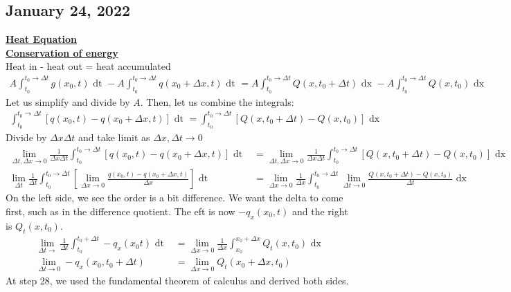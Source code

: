 \documentclass{article}
\newcommand{\topic}[1]{\textbf{\underline{#1}}}
\newcommand{\dx}{\text{ dx }}
\newcommand{\dt}{\text{ dt }}
\begin{document}
\subsection*{January 24, 2022}
\topic{Heat Equation}\\
\topic{Conservation of energy}\\
Heat in - heat out = heat accumulated
\begin{align}
  A \int^{t_0 \rightarrow \Delta t}_{t_0} g(x_0, t) \dt -
  A \int^{t_0 \rightarrow \Delta t}_{t_0} q(x_0 + \Delta x, t) \dt =
  A \int^{t_0 \rightarrow \Delta t}_{t_0} Q(x, t_0 + \Delta t) \dx -
  A \int^{t_0 \rightarrow \Delta t}_{t_0} Q(x, t_0) \dx
\end{align}
Let us simplify and divide by $A$. Then, let us combine the integrals:
\begin{align}
  \int^{t_0 \rightarrow \Delta t}_{t_0} [q(x_0, t) - q(x_0 + \Delta x, t)] \dt =
  \int^{t_0 \rightarrow \Delta t}_{t_0} [Q(x, t_0 + \Delta t) - Q(x, t_0)] \dx
\end{align}
Divide by $\Delta x \Delta t$ and take limit as $\Delta x, \Delta t \rightarrow 0$
\begin{align}
  \lim_{\Delta t, \Delta x \rightarrow 0} \frac{1}{\Delta x \Delta t}
  \int^{t_0 \rightarrow \Delta t}_{t_0} [q(x_0, t) - q(x_0 + \Delta x, t)] \dt & =
  \lim_{\Delta t, \Delta x \rightarrow 0} \frac{1}{\Delta x \Delta t}
  \int^{t_0 \rightarrow \Delta t}_{t_0} [Q(x, t_0 + \Delta t) - Q(x, t_0)] \dx\\
  \lim_{\Delta t} \frac{1}{\Delta t} \int^{t_0 \rightarrow \Delta t}_{t_0} [\lim_{\Delta x \rightarrow 0} \frac{q(x_0, t) - q(x_0 + \Delta x, t)}{\Delta x}] \dt & =
  \lim_{\Delta x \rightarrow 0} \frac{1}{\Delta x}
  \int^{t_0 \rightarrow \Delta t}_{t_0} \lim_{\Delta t \rightarrow 0} \frac
  {Q(x, t_0 + \Delta t) - Q(x, t_0)}{\Delta t} \dx
\end{align}
On the left side, we see the order is a bit difference. We want the delta to come first, such as in the difference quotient. The eft is now $-q_x(x_0, t)$ and the right is $Q_t(x, t_0)$.
\begin{align}
  \lim_{\Delta t \rightarrow} \frac{1}{\Delta t} \int^{t_0 + \Delta t}_{t_0} - q_x(x_0 t) \dt & =
  \lim_{\Delta x \rightarrow 0} \frac{1}{\Delta x} \int^{x_0 + \Delta x}_{x_0} Q_t(x, t_0) \dx\\
  \lim_{\Delta t \rightarrow 0} -q_x(x_0, t_0 + \Delta t) & = \lim_{\Delta x \rightarrow 0} Q_t(x_0 + \Delta x, t_0)
\end{align}
At step 28, we used the fundamental theorem of calculus and derived both sides.
\end{document}
